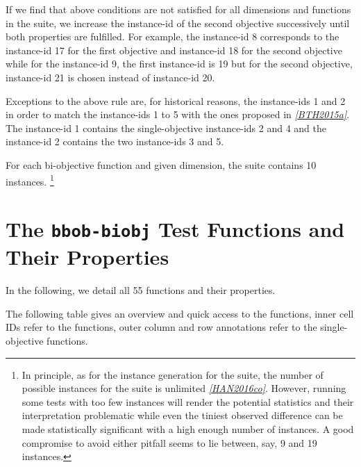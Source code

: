 \documentclass[letterpaper,12pt,english]{article}
\begin{document}
If we find that above conditions are not satisfied for all dimensions and
functions in the  suite, we increase the instance-id of the
second objective successively until both properties are fulfilled.
For example, the  instance-id
8 corresponds to the instance-id 17 for the first objective and instance-id 18 for
the second objective while for the  instance-id 9, the
first instance-id is 19 but for the second objective, instance-id 21 is chosen
instead of instance-id 20.

Exceptions to the above rule are, for historical reasons, the
 instance-ids 1 and 2 in order to match the instance-ids
1 to 5 with the ones proposed in \label{index:id9}{\hyperref[index:bth2015a]{\emph{{[}BTH2015a{]}}}}. The 
instance-id 1 contains the single-objective instance-ids 2 and 4 and
the  instance-id 2 contains the two instance-ids 3 and 5.

For each bi-objective function and given dimension, the  suite
contains 10 instances. \footnote[2]{
In principle, as for the instance generation for the  suite,
the number of possible instances for the  suite is unlimited
\label{index:id12}{\hyperref[index:han2016co]{\emph{{[}HAN2016co{]}}}}.
However, running some tests with too few instances will render the
potential statistics and their interpretation problematic while even the
tiniest observed difference can be made statistically significant with a
high enough number of instances. A good compromise to avoid either pitfall
seems to lie between, say, 9 and 19 instances.
}


\section{The \texttt{bbob-biobj} Test Functions and Their Properties}
\label{index:sec-test-functions}\label{index:the-bbob-biobj-test-functions-and-their-properties}
In the following, we detail all 55  functions
and their properties.

The following table gives an overview and quick access to the functions,
inner cell IDs refer to the  functions, outer column and row
annotations refer to the single-objective  functions.
\end{document}
